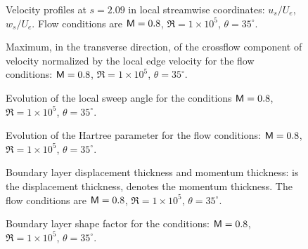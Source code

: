 %
\begin{figure}[p]
\centering
{}
\epsfxsize=5.4in 
\caption [Velocity profiles at $s=2.09$] {Velocity profiles at $s=2.09$ in
local streamwise coordinates: \solid $u_s/U_e$, \dashed $w_s/U_e$.  Flow
conditions are ${\sf M}=0.8$, $\Re=1\times 10^5$, $\theta=35^\circ$. \label{f:pro3}
}
\end{figure}
%
\begin{figure}[p]
\centering
{}
\epsfxsize=5.4in 
\caption [Maximum, in the transverse direction, of the crossflow component of
\protect \\velocity] {Maximum, in the transverse direction, of the crossflow
component of velocity normalized by the local edge velocity for the flow
conditions: ${\sf M}=0.8$, $\Re=1\times 10^5$, $\theta=35^\circ$. \label{f:r4.wmax}
}
\end{figure}
%
\begin{figure}[p]
\centering
{}
\epsfxsize=5.4in 
\caption[Evolution of the local sweep angle] {Evolution of the local sweep
angle for the conditions ${\sf M}=0.8$, $\Re=1\times 10^5$, $\theta=35^\circ$.
\label{f:r4.thetae} }
\end{figure}
%
\begin{figure}[p]
\centering
{}
\epsfxsize=5.4in 
\caption[Evolution of the Hartree parameter] {Evolution of the Hartree
parameter for the flow conditions: ${\sf M}=0.8$, $\Re=1\times 10^5$,
$\theta=35^\circ$.
\label{f:r4.betah} }
\end{figure}
%
\begin{figure}[p]
\centering
{}
\epsfxsize=5.4in 
\caption[Boundary layer displacement thickness and momentum thickness]
{Boundary layer displacement thickness and momentum thickness: \solid is the
displacement thickness, \dashed denotes the momentum thickness.  The flow
conditions are ${\sf M}=0.8$, $\Re=1\times 10^5$, $\theta=35^\circ$.
\label{f:r4.thick} }
\end{figure}
%
\begin{figure}[p]
\centering
{}
\epsfxsize=5.4in 
\caption[Boundary layer shape factor] {Boundary layer shape factor for the
conditions: ${\sf M}=0.8$, $\Re=1\times 10^5$, $\theta=35^\circ$.
\label{f:r4.shape} }
\end{figure}

